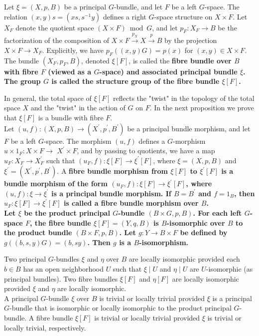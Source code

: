 Let $\xi=(X, p, B)$ be a principal $G$-bundle, and let $F$ be a left $G$-space. The relation $(x, y) s=\left(x s, s^{-1} y\right)$ defines a right $G$-space structure on $X \times F$. Let $X_F$ denote the quotient space $(X \times F) \bmod G$, and let $p_F: X_F \rightarrow B$ be the factorization of the composition of $X \times F \xrightarrow{p_X} X \xrightarrow{p} B$ by the projection $X \times F \rightarrow X_F$. Explicitly, we have $p_F((x, y) G)=p(x)$ for $(x, y) \in X \times F$.\\
The bundle $\left(X_F, p_F, B\right)$, denoted $\xi[F]$, is called the \bf{fibre bundle over $B$ with fibre $F$} (viewed as a $G$-space) and \bf{associated principal bundle $\xi$}. The group $G$ is called the \bf{structure group} of the fibre bundle $\xi[F]$.

In general, the total space of $\xi[F]$ reflects the "twist" in the topology of the total space $X$ and the "twist" in the action of $G$ on $F$. In the next proposition we prove that $\xi[F]$ is a bundle with fibre $F$.\\

Let $(u, f):(X, p, B) \rightarrow\left(X^{\prime}, p^{\prime}, B^{\prime}\right)$ be a principal bundle morphism, and let $F$ be a left $G$-space. The morphism $(u, f)$ defines a $G$-morphism $u \times 1_F: X \times F \rightarrow$ $X^{\prime} \times F$, and by passing to quotients, we have a map $u_F: X_F \rightarrow X_F^{\prime}$ such that $\left(u_F, f\right): \xi[F] \rightarrow \xi^{\prime}[F]$, where $\xi=(X, p, B)$ and $\xi^{\prime}=\left(X^{\prime}, p^{\prime}, B^{\prime}\right)$.
A \bf{fibre bundle morphism} from $\xi[F]$ to $\xi^{\prime}[F]$ is a bundle morphism of the form $\left(u_F, f\right): \xi[F] \rightarrow \xi^{\prime}[F]$, where $(u, f): \xi \rightarrow \xi^{\prime}$ is a principal bundle morphism. If $B=B^{\prime}$ and $f=1_B$, then $u_F: \xi[F] \rightarrow \xi^{\prime}[F]$ is called a fibre bundle morphism over $B$.\\

Let $\xi$ be the product principal $G$-bundle $(B \times G, p, B)$. For each left $G$-space $F$, the fibre bundle $\xi[F]=(Y, q, B)$ is $B$-isomorphic over $B$ to the product bundle $(B \times F, p, B)$. Let $g: Y \rightarrow B \times F$ be defined by $g((b, s, y) G)=(b, s y)$. Then $g$ is a $B$-isomorphism.

Two principal $G$-bundles $\xi$ and $\eta$ over $B$ are locally isomorphic provided each $b \in B$ has an open neighborhood $U$ such that $\xi \mid U$ and $\eta \mid U$ are $U$-isomorphic (as principal bundles). Two fibre bundles $\xi[F]$ and $\eta[F]$ are locally isomorphic provided $\xi$ and $\eta$ are locally isomorphic.\\
A principal $G$-bundle $\xi$ over $B$ is trivial or locally trivial provided $\xi$ is a principal $G$-bundle that is isomorphic or locally isomorphic to the product principal $G$-bundle. A fibre bundle $\xi[F]$ is trivial or locally trivial provided $\xi$ is trivial or locally trivial, respectively.

